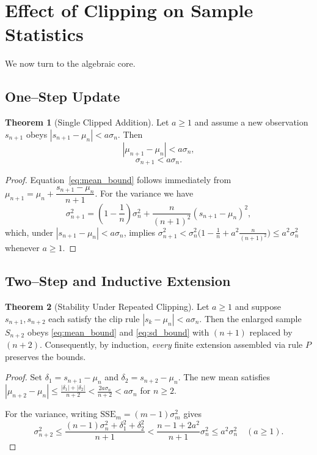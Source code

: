 \documentclass[12pt]{article}
\theoremstyle{definition}
\newtheorem{theorem}{Theorem}[section]
\begin{document}
\section{Effect of Clipping on Sample Statistics}
We now turn to the algebraic core.
\subsection{One--Step Update}
\begin{theorem}[Single Clipped Addition]
\label{thm:one_step}
Let $a\ge 1$ and assume a new observation $s_{n+1}$ obeys $|s_{n+1}-\mu_n|<a\sigma_n$.  Then
\begin{equation}\label{eq:mean_bound}
  |\mu_{n+1}-\mu_n| < a\sigma_n,
\end{equation}
\begin{equation}\label{eq:sd_bound}
  \sigma_{n+1} < a\sigma_n .
\end{equation}
\end{theorem}
\begin{proof}
Equation~\eqref{eq:mean_bound} follows immediately from
$\mu_{n+1}=\mu_n+\dfrac{s_{n+1}-\mu_n}{n+1}$.  For the variance we have
\[
  \sigma_{n+1}^2 = \left(1-\frac1n\right)\sigma_n^2 + \frac{n}{(n+1)^2}(s_{n+1}-\mu_n)^2,
\]
which, under $|s_{n+1}-\mu_n|<a\sigma_n$, implies
$\sigma_{n+1}^2<\sigma_n^2\bigl(1-\tfrac1n+a^2\tfrac{n}{(n+1)^2}\bigr)\le a^2\sigma_n^2$ whenever $a\ge 1$.
\end{proof}

\subsection{Two--Step and Inductive Extension}
\begin{theorem}[Stability Under Repeated Clipping]
\label{thm:two_step}
Let $a\ge 1$ and suppose $s_{n+1},s_{n+2}$ each satisfy the clip rule
$|s_{k}-\mu_n|<a\sigma_n$.  Then the enlarged sample $S_{n+2}$ obeys
\eqref{eq:mean_bound} and \eqref{eq:sd_bound} with $(n+1)$ replaced by $(n+2)$.  Consequently, by induction, \emph{every} finite extension assembled via rule $P$ preserves the bounds.
\end{theorem}
\begin{proof}
Set $\delta_1=s_{n+1}-\mu_n$ and $\delta_2=s_{n+2}-\mu_n$.  The new mean satisfies
$|\mu_{n+2}-\mu_n|\le\frac{|\delta_1|+|\delta_2|}{n+2}<\frac{2a\sigma_n}{n+2}<a\sigma_n$ for $n\ge2$.

For the variance, writing $\mathrm{SSE}_m=(m-1)\sigma_m^2$ gives
\[
\sigma_{n+2}^2\le\frac{(n-1)\sigma_n^2+\delta_1^2+\delta_2^2}{n+1}
<\frac{n-1+2a^2}{n+1}\sigma_n^2\le a^2\sigma_n^2 \quad(a\ge1).
\]
\end{proof}
\end{document}

